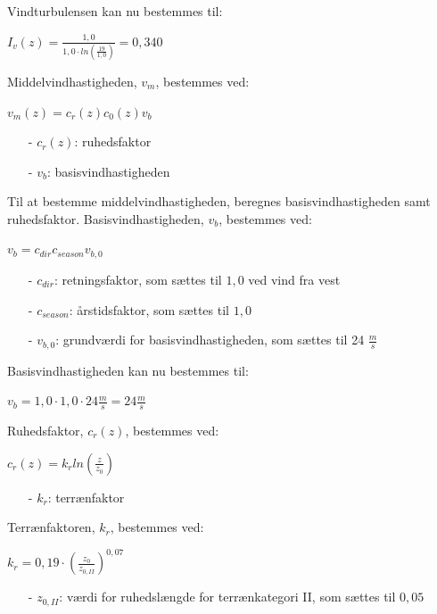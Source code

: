 Vindturbulensen kan nu bestemmes til:
\begin{center}
$I_v(z)=\frac{1,\!0}{1,\!0\cdot ln(\frac{19}{1,\!0})}=0,\!340$
\end{center}
Middelvindhastigheden, $v_m$, bestemmes ved:
\begin{center}
$v_m(z)=c_r(z)c_0(z)v_b$
\end{center}
\begin{itemize}
	\item[-] $c_r(z)$: ruhedsfaktor
	\item[-] $v_b$: basisvindhastigheden
\end{itemize}
Til at bestemme middelvindhastigheden, beregnes basisvindhastigheden samt ruhedsfaktor.
\newline
\newline
Basisvindhastigheden, $v_b$, bestemmes ved:
\begin{center}
$v_b=c_{dir}c_{season}v_{b,0}$
\end{center}
\begin{itemize}
	\item[-] $c_{dir}$: retningsfaktor, som sættes til $1,\!0$ ved vind fra vest \citep[ tabel 1a kapitel 4.2]{EU91}
	\item[-] $c_{season}$: årstidsfaktor, som sættes til $1,\!0$ \citep[ tabel 1b kapitel 4.2]{EU91}
	\item[-] $v_{b,0}$: grundværdi for basisvindhastigheden, som sættes til 24 $\frac{m}{s}$ \citep[ kapitel 4.2]{EU91}
\end{itemize}
Basisvindhastigheden kan nu bestemmes til:
\begin{center}
$v_b=1,\!0\cdot 1,\!0\cdot 24 \frac{m}{s}=24 \frac{m}{s}$
\end{center}
Ruhedsfaktor, $c_r(z)$, bestemmes ved:
\begin{center}
$c_r(z)=k_rln(\frac{z}{z_0})$
\end{center}
\begin{itemize}
	\item[-] $k_r$: terrænfaktor
\end{itemize}
Terrænfaktoren, $k_r$, bestemmes ved:
\begin{center}
$k_r=0,\!19\cdot (\frac{z_0}{z_{0,II}})^{0,\!07}$
\end{center}
\begin{itemize}
	\item[-] $z_{0,II}$: værdi for ruhedslængde for terrænkategori II, som sættes til $0,\!05$ \citep[ kapitel 4.3.2]{EU91}
\end{itemize}
